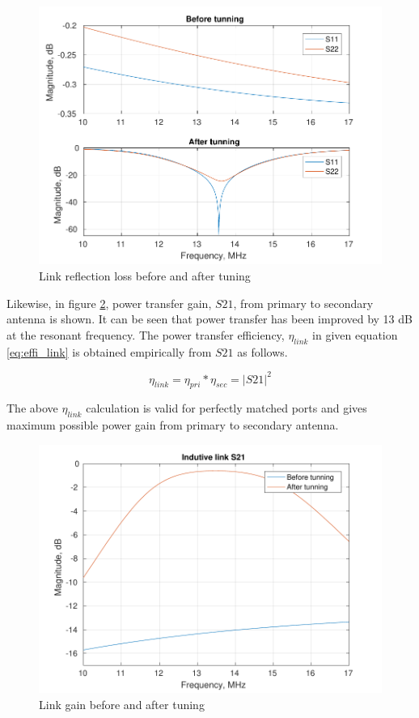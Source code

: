 \documentclass[UKenglish]{ifimaster}  %
\begin{document}
\begin{figure} [!htbp]
  \centering
  \includegraphics[width=1.05\textwidth]{img/ant_s1_s2_both.pdf} 
 \caption{Link reflection loss before and after tuning} 
\label{fig:ant_S_loss} 
\end{figure}

Likewise, in figure \ref{fig:ant_S_gain}, power transfer gain, $S21$, from primary to secondary antenna is shown. It can be seen that  power transfer has been improved by 13 dB at the resonant frequency. The power transfer efficiency, $\eta_{link}$ in given equation \ref{eq:effi_link} is obtained empirically from $S21$ as follows.

\begin{equation} \label{eq:effi_link_s21}	%
\eta_{link} = \eta_{pri}*\eta_{sec} = |S21|^{2}
\end{equation} 

The above $\eta_{link}$ calculation is valid for perfectly matched ports and gives maximum possible power gain from primary to secondary antenna. \\
\begin{figure} [!htbp]
  \centering
  \includegraphics[width=1.05\textwidth]{img/ant_s21_both.pdf}
 \caption{Link gain before and after tuning} 
\label{fig:ant_S_gain} 
\end{figure}
\end{document}
